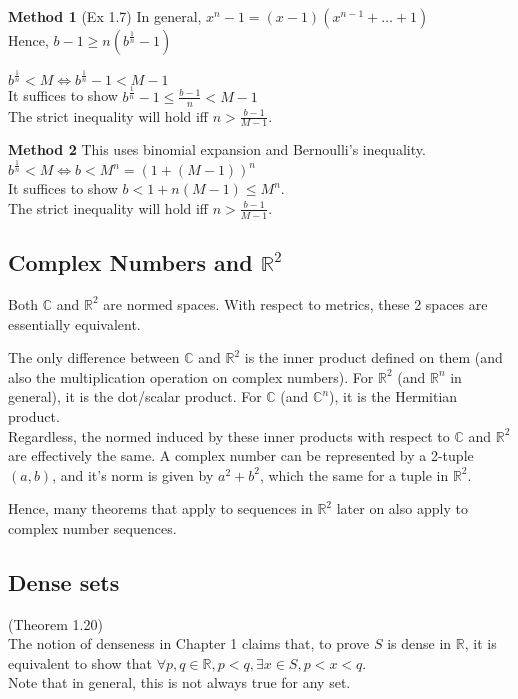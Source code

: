 \documentclass{article}
\begin{document}
\textbf{Method 1} (Ex 1.7)
In general, $x^n - 1 = (x-1)(x^{n-1} + \dots + 1)$\\
Hence, $b - 1 \geq n(b^\frac{1}{n}-1)$

$b^\frac{1}{n}<M \iff b^\frac{1}{n} - 1 < M - 1$\\
It suffices to show $b^\frac{1}{n}-1 \leq \frac{b-1}{n} < M - 1$\\
The strict inequality will hold iff $n > \frac{b-1}{M-1}$.

\textbf{Method 2}
This uses binomial expansion and Bernoulli's inequality.
$b^\frac{1}{n}<M \iff b < M^n = (1 + (M - 1))^n$\\
It suffices to show $b < 1 + n(M - 1) \leq M^n$.\\
The strict inequality will hold iff $n > \frac{b-1}{M-1}$.


\subsection{Complex Numbers and $\mathbb{R}^2$}
Both $\mathbb{C}$ and $\mathbb{R}^2$ are normed spaces. With respect to metrics, these 2 spaces are essentially equivalent. 

The only difference between $\mathbb{C}$ and $\mathbb{R}^2$ is the inner product defined on them (and also the multiplication operation on complex numbers). For $\mathbb{R}^2$ (and $\mathbb{R}^n$ in general), it is the dot/scalar product. For $\mathbb{C}$ (and $\mathbb{C}^n$), it is the Hermitian product. \\
Regardless, the normed induced by these inner products with respect to $\mathbb{C}$ and $\mathbb{R}^2$ are effectively the same.
A complex number can be represented by a 2-tuple $(a,b)$, and it's norm is given by $a^2+b^2$, which the same for a tuple in $\mathbb{R}^2$.

Hence, many theorems that apply to sequences in $\mathbb{R}^2$ later on also apply to complex number sequences.

\subsection{Dense sets}
(Theorem 1.20)\\
The notion of denseness in Chapter 1 claims that, to prove $S$ is dense in $\mathbb{R}$, it is equivalent to show that $\forall p,q\in \mathbb{R}, p<q, \exists x\in S, p<x<q$.\\
Note that in general, this is not always true for any set.
\end{document}
